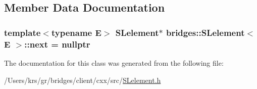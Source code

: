 \subsection{Member Data Documentation}
\hypertarget{classbridges_1_1_s_lelement_ad7449d10a09ebc52653a7baed812aa43}{}
\subsubsection[{next}]{\setlength{\rightskip}{0pt plus 5cm}template$<$typename E$>$ {\bf S\+Lelement}$\ast$ {\bf bridges\+::\+S\+Lelement}$<$ E $>$\+::next = nullptr\hspace{0.3cm}{\ttfamily [protected]}}\label{classbridges_1_1_s_lelement_ad7449d10a09ebc52653a7baed812aa43}


The documentation for this class was generated from the following file\+:\begin{DoxyCompactItemize}
\item 
/\+Users/krs/gr/bridges/client/cxx/src/\hyperlink{_s_lelement_8h}{S\+Lelement.\+h}\end{DoxyCompactItemize}
